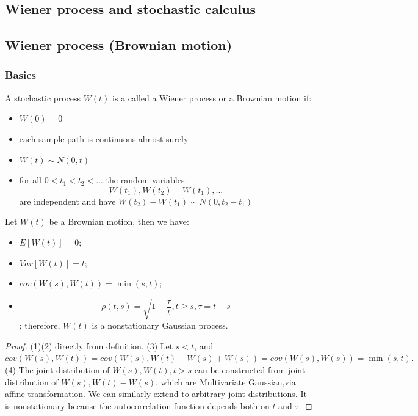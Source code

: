 \begin{refsection}
	\startcontents[chapters]	
	\chapter{Wiener process and stochastic calculus}\label{ch:theory-of-stochastic-process}
	\minitoc
	
	
	
	
	

\section{Wiener process (Brownian motion)}
\subsection{Basics}
\begin{definition} 
	A stochastic process $W(t)$ is a called a Wiener process or a Brownian motion if:
	\begin{itemize}
		\item $W(0) = 0$
		\item each sample path is continuous almost surely
		\item $W(t)\sim N(0,t)$
		\item for all $0<t_1<t_2<...$ the random variables:
		$$W(t_1),W(t_2)-W(t_1),...$$ are independent and have $W(t_2)-W(t_1) \sim N(0,t_2-t_1)$
	\end{itemize}
\end{definition}


\begin{lemma}\label{ch:theory-of-stochastic-process:th:Brownianmotionbasicproperty}
	Let $W(t)$ be a Brownian motion, then we have:
	\begin{itemize}
		\item $E[W(t)] = 0$;
		\item $Var[W(t)] = t$;
		\item $cov(W(s),W(t)) = \min(s,t)$;
		\item $$\rho(t,s) = \sqrt{1 - \frac{\tau}{t}}, t \geq s, \tau = t-s$$; therefore, $W(t)$ is a nonstationary Gaussian process.
	\end{itemize}
\end{lemma}
\begin{proof}
	(1)(2) directly from definition. (3) Let $s<t$, and $cov(W(s),W(t)) = cov(W(s),W(t)-W(s)+W(s)) = cov(W(s),W(s)) = \min(s,t).$ (4) The joint distribution of $W(s),W(t),t>s$ can be constructed from joint distribution of $W(s),W(t)-W(s)$, which are Multivariate Gaussian,via affine transformation. We can similarly extend to arbitrary joint distributions. It is nonstationary because the autocorrelation function depends both on $t$ and $\tau$.
\end{proof}




\end{refsection}
